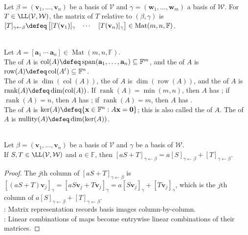 \begin{definition} \\
Let $\beta = (\mathbf{v}_1, \ldots, \mathbf{v}_n)$ be a basis of $\mathcal{V}$ and $\gamma = (\mathbf{w}_1, \ldots, \mathbf{w}_m)$ a basis of $\mathcal{W}$. For $T \in \LL(\mathcal{V}, \mathcal{W})$, the matrix of $T$ relative to $(\beta,\gamma)$ is $[T]_{\gamma \leftarrow \beta} \defeq
\begin{bmatrix}
[T(\mathbf{v}_1)]_{\gamma} & \cdots & [T(\mathbf{v}_n)]_{\gamma}
\end{bmatrix}
\in \operatorname{Mat}(m,n,\mathbb{F})$.
\end{definition}

\begin{definition} \\
Let $A=[\mathbf{a}_1\ \cdots\ \mathbf{a}_n]\in\operatorname{Mat}(m,n,\mathbb{F})$.\\
The  of $A$ is $\operatorname{col}(A)\defeq\operatorname{span}(\mathbf{a}_1,\ldots,\mathbf{a}_n)\subseteq\mathbb{F}^m$, and the  of $A$ is $\operatorname{row}(A)\defeq\operatorname{col}(A^t)\subseteq\mathbb{F}^n$.\\
The  of $A$ is $\dim(\operatorname{col}(A))$, the  of $A$ is $\dim(\operatorname{row}(A))$, and the  of $A$ is $\operatorname{rank}(A)\defeq\dim(\operatorname{col}(A))$. If $\operatorname{rank}(A)=\min(m,n)$, then $A$ has ; if $\operatorname{rank}(A)=n$, then $A$ has ; if $\operatorname{rank}(A)=m$, then $A$ has .\\
The  of $A$ is $\ker(A)\defeq\{\mathbf{x}\in\mathbb{F}^n:A\mathbf{x}=\mathbf{0}\}$; this is also called the  of $A$. The  of $A$ is $\operatorname{nullity}(A)\defeq\dim(\ker(A))$.
\end{definition}

\begin{proposition} \label{prop:matrix-representation-respects-linear-combinations} \\
Let $\beta=(\mathbf{v}_1,\ldots,\mathbf{v}_n)$ be a basis of $\mathcal{V}$ and $\gamma$ be a basis of $\mathcal{W}$.\\
 If $S,T\in\LL(\mathcal{V},\mathcal{W})$ and $a\in\mathbb{F}$, then $[aS+T]_{\gamma \leftarrow \beta}=a[S]_{\gamma \leftarrow \beta}+[T]_{\gamma \leftarrow \beta}$.
\begin{proof}
The $j$th column of $[aS+T]_{\gamma \leftarrow \beta}$ is $[(aS+T)\mathbf{v}_j]_{\gamma}=[aS\mathbf{v}_j+T\mathbf{v}_j]_{\gamma}=a[S\mathbf{v}_j]_{\gamma}+[T\mathbf{v}_j]_{\gamma}$, which is the $j$th column of $a[S]_{\gamma \leftarrow \beta}+[T]_{\gamma \leftarrow \beta}$.\\
: Matrix representation records basis images column-by-column.\\
: Linear combinations of maps become entrywise linear combinations of their matrices.
\end{proof}
\end{proposition}

